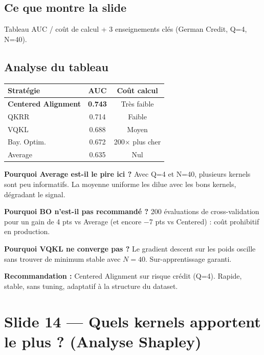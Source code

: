 \documentclass[12pt, a4paper]{article}
\begin{document}
\subsection*{Ce que montre la slide}

Tableau AUC / coût de calcul + 3 enseignements clés (German Credit, Q=4, N=40).

\subsection*{Analyse du tableau}

\begin{center}
\begin{tabular}{lcc}
  \toprule
  \textbf{Stratégie} & \textbf{AUC} & \textbf{Coût calcul} \\
  \midrule
  \textbf{Centered Alignment} & \textbf{0.743} & Très faible \\
  QKRR              & 0.714 & Faible \\
  VQKL              & 0.688 & Moyen \\
  Bay. Optim.       & 0.672 & 200$\times$ plus cher \\
  Average           & 0.635 & Nul \\
  \bottomrule
\end{tabular}
\end{center}

\textbf{Pourquoi Average est-il le pire ici ?}
Avec Q=4 et N=40, plusieurs kernels sont peu informatifs.
La moyenne uniforme les dilue avec les bons kernels, dégradant le signal.

\textbf{Pourquoi BO n'est-il pas recommandé ?}
200 évaluations de cross-validation pour un gain de 4 pts vs Average
(et encore $-$7 pts vs Centered) : coût prohibitif en production.

\textbf{Pourquoi VQKL ne converge pas ?}
Le gradient descent sur les poids oscille sans trouver de minimum stable
avec $N=40$. Sur-apprentissage garanti.

\begin{retenir}
\textbf{Recommandation :} Centered Alignment sur risque crédit (Q=4).
Rapide, stable, sans tuning, adaptatif à la structure du dataset.
\end{retenir}

\section{Slide 14 — Quels kernels apportent le plus ? (Analyse Shapley)}
\end{document}
